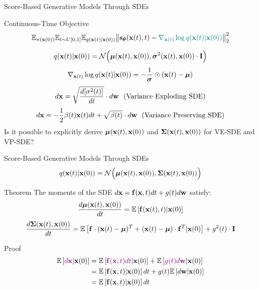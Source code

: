 \documentclass{beamer}
\begin{document}
\begin{frame}{Score-Based Generative Models Through SDEs}
	\vspace{-0.3cm}
	\begin{block}{Continuous-Time Objective}
		\vspace{-0.5cm}
		\[
			\mathbb{E}_{\pi(\mathbf{x}(0))} \mathbb{E}_{t \sim U[0, 1]} \mathbb{E}_{q(\mathbf{x}(t) | \mathbf{x}(0))}\bigl\| \mathbf{s}_{\boldsymbol{\theta}}(\mathbf{x}(t), t) - {\color{teal}\nabla_{\mathbf{x}(t)} \log q(\mathbf{x}(t) | \mathbf{x}(0))} \bigr\|^2_2 
		\]
		\vspace{-0.7cm}
	\end{block}
	\[
		q(\mathbf{x}(t) | \mathbf{x}(0)) = \mathcal{N}\Bigl(\boldsymbol{\mu}(\mathbf{x}(t), \mathbf{x}(0)), \boldsymbol{\sigma}^2(\mathbf{x}(t), \mathbf{x}(0)) \cdot \mathbf{I} \Bigr)
	\]
	\[
		\nabla_{\mathbf{x}(t)} \log q(\mathbf{x}(t) | \mathbf{x}(0)) = - \frac{1}{\boldsymbol{\sigma}} \odot (\mathbf{x}(t) - \boldsymbol{\mu})
	\]
	\[
		d \mathbf{x} = \sqrt{\frac{ d [\sigma^2(t)]}{dt}} \cdot d \mathbf{w} \ \ \mbox{(Variance Exploding SDE)}
	\]
	\vspace{-0.3cm}
	\[
		d \mathbf{x} = - \frac{1}{2} \beta(t) \mathbf{x}(t) dt + \sqrt{\beta(t)} \cdot d \mathbf{w} \ \ \mbox{(Variance Preserving SDE)}
	\]
	Is it possible to explicitly derive $\boldsymbol{\mu}(\mathbf{x}(t), \mathbf{x}(0))$ and $\boldsymbol{\Sigma}(\mathbf{x}(t), \mathbf{x}(0))$ for VE-SDE and VP-SDE?
\end{frame}
\begin{frame}{Score-Based Generative Models Through SDEs}
	\[
		q(\mathbf{x}(t) | \mathbf{x}(0)) = \mathcal{N}\Bigl(\boldsymbol{\mu}(\mathbf{x}(t), \mathbf{x}(0)), \boldsymbol{\Sigma}(\mathbf{x}(t), \mathbf{x}(0))\Bigr)
	\]
	\vspace{-0.5cm}
	\begin{block}{Theorem}
		The moments of the SDE $d\mathbf{x} = \mathbf{f}(\mathbf{x}, t) dt + g(t) d \mathbf{w}$ satisfy:
		\[
			\frac{d \boldsymbol{\mu}(\mathbf{x}(t), \mathbf{x}(0))}{dt} = \mathbb{E} \left[ \mathbf{f}(\mathbf{x}(t), t) | \mathbf{x}(0)\right]
		\]
		\[
			\frac{d \boldsymbol{\Sigma}(\mathbf{x}(t), \mathbf{x}(0))}{dt} = \mathbb{E} \left[ \mathbf{f} \cdot (\mathbf{x}(t) - \boldsymbol{\mu})^T + (\mathbf{x}(t) - \boldsymbol{\mu}) \cdot \mathbf{f}^T | \mathbf{x}(0)\right] + g^2(t) \cdot \mathbf{I}
		\]
	\end{block}
	\begin{block}{Proof}
		\vspace{-0.7cm}
		\begin{align*}
			\mathbb{E}\left[{\color{violet}d\mathbf{x}} | \mathbf{x}(0) \right] &= \mathbb{E}\left[{\color{violet}\mathbf{f}(\mathbf{x}, t) dt} | \mathbf{x}(0) \right] + \mathbb{E}\left[{\color{violet}g(t) d \mathbf{w}} | \mathbf{x}(0) \right] \\
			&= \mathbb{E}\left[\mathbf{f}(\mathbf{x}, t) | \mathbf{x}(0) \right] dt + g(t) \mathbb{E}\left[d \mathbf{w} | \mathbf{x}(0) \right] \\
			&= \mathbb{E}\left[\mathbf{f}(\mathbf{x}, t) | \mathbf{x}(0) \right] dt
		\end{align*}
	\end{block}
\end{frame}
\end{document}
